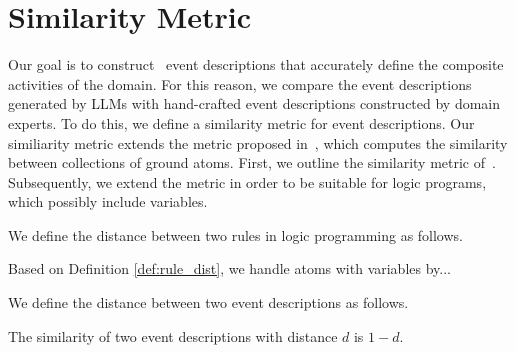 \section{Similarity Metric}\label{sec:similarity}

Our goal is to construct \rtec\ event descriptions that accurately define the composite activities of the domain.
%
For this reason, we compare the event descriptions generated by LLMs with hand-crafted event descriptions constructed by domain experts.
%
To do this, we define a similarity metric for event descriptions.
%
Our similiarity metric extends the metric proposed in~\cite{DBLP:journals/ml/MichelioudakisA19}, which computes the similarity between collections of ground atoms.
%
First, we outline the similarity metric of~\cite{DBLP:journals/ml/MichelioudakisA19}.
%
Subsequently, we extend the metric in order to be suitable for logic programs, which possibly include variables.

\begin{definition}\label{def:ground_atom_dist}
%
%
\qeddef
%
\end{definition}

\begin{definition}\label{def:coll_ground_atoms_dist}

%
\qeddef
%
\end{definition}

We define the distance between two rules in logic programming as follows.

\begin{definition}\label{def:rule_dist}

%
\qeddef
%
\end{definition}

Based on Definition \ref{def:rule_dist}, we handle atoms with variables by...


We define the distance between two event descriptions as follows.

\begin{definition}\label{def:ed_dist}

%
\qeddef
%
\end{definition}

The similarity of two event descriptions with distance $d$ is $1\minus d$.

